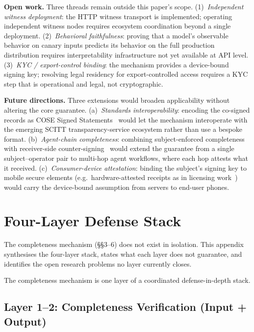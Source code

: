 \documentclass[11pt,a4paper]{article}
\begin{document}
\textbf{Open work.} Three threads remain outside this paper's scope.
(1)~\textit{Independent witness deployment}: the HTTP witness transport is implemented;
operating independent witness nodes requires ecosystem coordination beyond a single
deployment.
(2)~\textit{Behavioral faithfulness}: proving that a model's observable behavior on
canary inputs predicts its behavior on the full production distribution requires
interpretability infrastructure not yet available at API level.
(3)~\textit{KYC / export-control binding}: the mechanism provides a device-bound
signing key; resolving legal residency for export-controlled access requires a KYC
step that is operational and legal, not cryptographic.

\textbf{Future directions.} Three extensions would broaden applicability without
altering the core guarantee. (a)~\textit{Standards interoperability}: encoding the
co-signed records as COSE Signed Statements~\cite{scitt-arch} would let the mechanism
interoperate with the emerging SCITT transparency-service ecosystem rather than use a
bespoke format. (b)~\textit{Agent-chain completeness}: combining subject-enforced
completeness with receiver-side counter-signing~\cite{sello2026} would extend the
guarantee from a single subject--operator pair to multi-hop agent workflows, where each
hop attests what it received. (c)~\textit{Consumer-device attestation}: binding the
subject's signing key to mobile secure elements (e.g.\ hardware-attested receipts as in
licensing work~\cite{aegon2026}) would carry the device-bound assumption from servers to
end-user phones.

\appendix
\section{Four-Layer Defense Stack}
\label{sec:defensestack}

The completeness mechanism (§§3--6) does not exist in isolation. This appendix
synthesises the four-layer stack, states what each layer does not guarantee, and
identifies the open research problems no layer currently closes.

The completeness mechanism is one layer of a coordinated defense-in-depth stack.

\subsection{Layer 1--2: Completeness Verification (Input + Output)}
\end{document}
